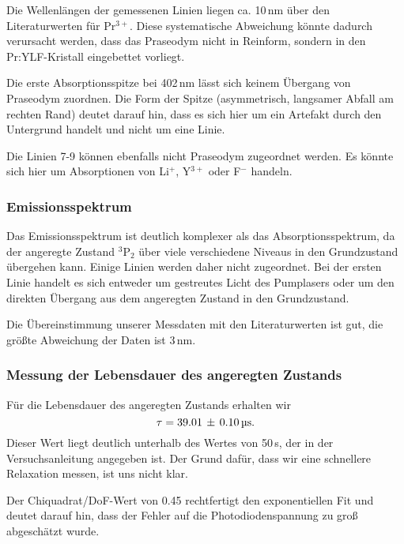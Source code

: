 Die Wellenlängen der gemessenen Linien liegen ca. 10\,nm über den Literaturwerten für Pr$^{3+}$.
Diese systematische Abweichung könnte dadurch verursacht werden,
dass das Praseodym nicht in Reinform, sondern in den Pr:YLF-Kristall eingebettet vorliegt.

Die erste Absorptionsspitze bei 402\,nm lässt sich keinem Übergang von Praseodym zuordnen.
Die Form der Spitze (asymmetrisch, langsamer Abfall am rechten Rand) deutet darauf hin,
dass es sich hier um ein Artefakt durch den Untergrund handelt und nicht um eine Linie.

Die Linien 7-9 können ebenfalls nicht Praseodym zugeordnet werden.
Es könnte sich hier um Absorptionen von Li$^+$, Y$^{3+}$ oder F$^-$ handeln.



\FloatBarrier

\subsubsection{Emissionsspektrum}

Das Emissionsspektrum ist deutlich komplexer als das Absorptionsspektrum,
da der angeregte Zustand $^3$P$_2$ über viele verschiedene Niveaus in den Grundzustand übergehen
kann.
Einige Linien werden daher nicht zugeordnet.
Bei der ersten Linie handelt es sich entweder um gestreutes Licht des Pumplasers oder um den
direkten Übergang aus dem angeregten Zustand in den Grundzustand.

Die Übereinstimmung unserer Messdaten mit den Literaturwerten ist gut,
die größte Abweichung der Daten ist 3\,nm.



\subsubsection{Messung der Lebensdauer des angeregten Zustands}

Für die Lebensdauer des angeregten Zustands erhalten wir
\begin{equation*}
\tau = 39.01\,\pm\,0.10\,\text{\textmu s}.
\end{equation*}
Dieser Wert liegt deutlich unterhalb des Wertes von 50\,\textmu s,
der in der Versuchsanleitung angegeben ist.
Der Grund dafür, dass wir eine schnellere Relaxation messen, ist uns nicht klar.

Der Chiquadrat/DoF-Wert von 0.45 rechtfertigt den exponentiellen Fit und deutet darauf hin,
dass der Fehler auf die Photodiodenspannung zu groß abgeschätzt wurde.

